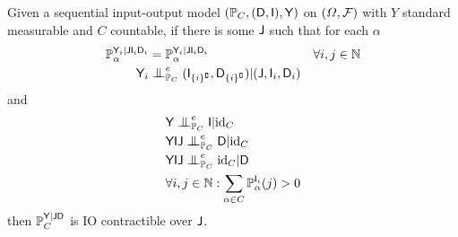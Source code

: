 \begin{theorem}\label{th:ind}
Given a sequential input-output model $(\mathbb{P}_C,(\mathsf{D},\mathsf{I}),\mathsf{Y})$ on $(\Omega,\mathcal{F})$ with $Y$ standard measurable and $C$ countable, if there is some $\mathsf{J}$ such that for each $\alpha$
\begin{align}
    \prob{P}_\alpha^{\RV{Y}_i|\RV{J}\RV{I}_i\RV{D}_i} &= \prob{P}_\alpha^{\RV{Y}_i|\RV{J}\RV{I}_i\RV{D}_i} &\forall i,j\in \mathbb{N}\\
    \RV{Y}_i&\CI^e_{\prob{P}_C} (\RV{I}_{\{i\}^{\complement}},\RV{D}_{\{i\}^{\complement}})|(\RV{J},\RV{I}_i,\RV{D}_i)
\end{align}
and
\begin{align}
    &\RV{Y}\CI^e_{\prob{P}_C} \RV{I} | \text{id}_C\\
    &\RV{YIJ}\CI^e_{\prob{P}_C} \RV{D}|\text{id}_C\\
    &\RV{YIJ}\CI^e_{\prob{P}_C} \text{id}_C|\RV{D}\\
    &\forall i,j\in \mathbb{N}: \sum_{\alpha\in C} \prob{P}_\alpha^{\RV{I}_i}(j)>0
\end{align}
then $\mathbb{P}_C^{\mathsf{Y}|\mathsf{JD}}$ is IO contractible over $\mathsf{J}$.
\end{theorem}

